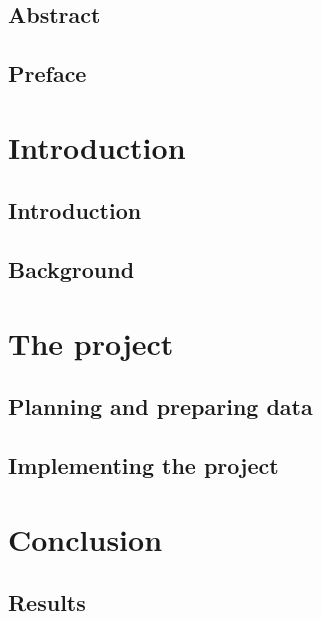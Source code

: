 \documentclass[UKenglish]{ifimaster}
\title{\problemStatement}
\subtitle{
}
\author{Joakim I. Frogner}
\begin{document}
\duoforside[dept={Department of Informatics},
program={Programming and Networks},
long]

\frontmatter{}
\chapter*{Abstract}

\tableofcontents{} 
\listoffigures{}
\listoftables{}

\chapter*{Preface}

\mainmatter{}
\part{Introduction}

\chapter{Introduction}


\chapter{Background}



\part{The project}
\chapter{Planning and preparing data}
\newpage


\chapter{Implementing the project}
\newpage


\part{Conclusion}
 
\chapter{Results} 



\backmatter{}
\printbibliography
\end{document}
